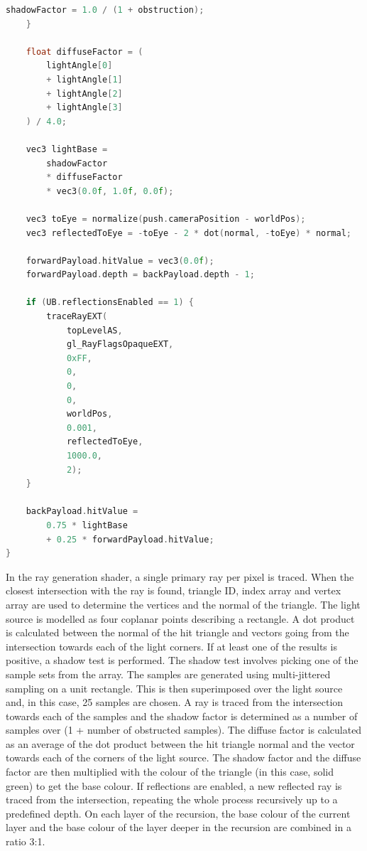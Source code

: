 \documentclass[times, utf8, zavrsni, numeric]{fer}
\begin{document}
\begin{lstlisting}[language=c++, style=cppstyle, caption=Closest hit shader used in the application, frame=single]
        shadowFactor = 1.0 / (1 + obstruction);
    }

    float diffuseFactor = (
        lightAngle[0]
        + lightAngle[1]
        + lightAngle[2]
        + lightAngle[3]
    ) / 4.0;

    vec3 lightBase =
        shadowFactor
        * diffuseFactor
        * vec3(0.0f, 1.0f, 0.0f);

    vec3 toEye = normalize(push.cameraPosition - worldPos);
    vec3 reflectedToEye = -toEye - 2 * dot(normal, -toEye) * normal;

    forwardPayload.hitValue = vec3(0.0f);
    forwardPayload.depth = backPayload.depth - 1;

    if (UB.reflectionsEnabled == 1) {
        traceRayEXT(
            topLevelAS,
            gl_RayFlagsOpaqueEXT,
            0xFF,
            0,
            0,
            0,
            worldPos,
            0.001,
            reflectedToEye,
            1000.0,
            2);
    }

    backPayload.hitValue =
        0.75 * lightBase
        + 0.25 * forwardPayload.hitValue;
}
\end{lstlisting}

In the ray generation shader, a single primary ray per pixel is traced. When the closest intersection with the ray is found, triangle ID, index array and vertex array are used to determine the vertices and the normal of the triangle. The light source is modelled as four coplanar points describing a rectangle. A dot product is calculated between the normal of the hit triangle and vectors going from the intersection towards each of the light corners. If at least one of the results is positive, a shadow test is performed.
The shadow test involves picking one of the sample sets from the array. The samples are generated using multi-jittered sampling \cite{ray_tracing} on a unit rectangle. This is then superimposed over the light source and, in this case, 25 samples are chosen. A ray is traced from the intersection towards each of the samples and the shadow factor is determined as a number of samples over (1 + number of obstructed samples). The diffuse factor is calculated as an average of the dot product between the hit triangle normal and the vector towards each of the corners of the light source. The shadow factor and the diffuse factor are then multiplied with the colour of the triangle (in this case, solid green) to get the base colour. If reflections are enabled, a new reflected ray is traced from the intersection, repeating the whole process recursively up to a predefined depth. On each layer of the recursion, the base colour of the current layer and the base colour of the layer deeper in the recursion are combined in a ratio 3:1.
\end{document}
